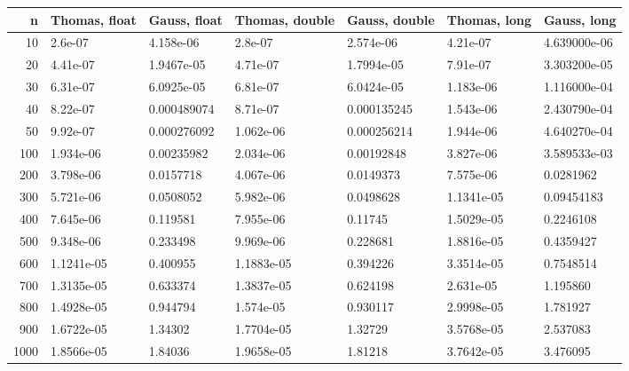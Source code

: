 \documentclass[twoside]{article}
\begin{document}
\begin{table}
\centering
\begin{tabular}{|r||l|l|l|l|l|l|}
\hline
\textbf{n} & \textbf{Thomas, float} & \textbf{Gauss, float} & \textbf{Thomas, double} & \textbf{Gauss, double} & \textbf{Thomas, long} & \textbf{Gauss, long} \\
\hline \hline
10 & 2.6e-07 & 4.158e-06 & 2.8e-07 & 2.574e-06 & 4.21e-07 & 4.639000e-06 \\ \hline
20 & 4.41e-07 & 1.9467e-05 & 4.71e-07 & 1.7994e-05 & 7.91e-07 & 3.303200e-05 \\ \hline
30 & 6.31e-07 & 6.0925e-05 & 6.81e-07 & 6.0424e-05 & 1.183e-06 & 1.116000e-04 \\ \hline
40 & 8.22e-07 & 0.000489074 & 8.71e-07 & 0.000135245 & 1.543e-06 & 2.430790e-04 \\ \hline
50 & 9.92e-07 & 0.000276092 & 1.062e-06 & 0.000256214 & 1.944e-06 & 4.640270e-04 \\ \hline
100 & 1.934e-06 & 0.00235982 & 2.034e-06 & 0.00192848 & 3.827e-06 & 3.589533e-03 \\ \hline
200 & 3.798e-06 & 0.0157718 & 4.067e-06 & 0.0149373 & 7.575e-06 & 0.0281962 \\ \hline
300 & 5.721e-06 & 0.0508052 & 5.982e-06 & 0.0498628 & 1.1341e-05 & 0.09454183 \\ \hline
400 & 7.645e-06 & 0.119581 & 7.955e-06 & 0.11745 & 1.5029e-05 & 0.2246108 \\ \hline
500 & 9.348e-06 & 0.233498 & 9.969e-06 & 0.228681 & 1.8816e-05 & 0.4359427 \\ \hline
600 & 1.1241e-05 & 0.400955 & 1.1883e-05 & 0.394226 & 3.3514e-05 & 0.7548514 \\ \hline
700 & 1.3135e-05 & 0.633374 & 1.3837e-05 & 0.624198 & 2.631e-05 & 1.195860 \\ \hline
800 & 1.4928e-05 & 0.944794 & 1.574e-05 & 0.930117 &  2.9998e-05 & 1.781927 \\ \hline
900 & 1.6722e-05 & 1.34302 & 1.7704e-05 & 1.32729 & 3.5768e-05 & 2.537083 \\ \hline
1000 & 1.8566e-05 & 1.84036 & 1.9658e-05 & 1.81218 & 3.7642e-05 & 3.476095 \\ \hline
\end{tabular}
\end{table}

  
\end{document}
